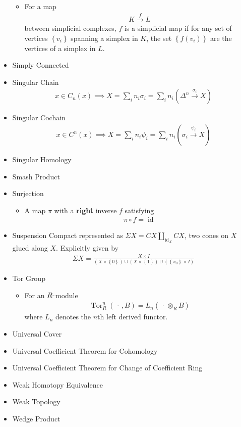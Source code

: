 \begin{itemize}
  \begin{itemize}
  \tightlist
  \item
    For a map
    \begin{align*}K\xrightarrow{f} L\end{align*}
    between simplicial complexes, \(f\) is a simplicial map if for any
    set of vertices \(\left\{{v_i}\right\}\) spanning a simplex in
    \(K\), the set \(\left\{{f(v_i)}\right\}\) are the vertices of a
    simplex in \(L\).
  \end{itemize}
\item
  Simply Connected
\item
  Singular Chain
  \begin{align*}
  x \in C_n(x) \implies X = \sum_i n_i \sigma_i = \sum_i n_i (\Delta^n \xrightarrow{\sigma_i} X)\end{align*}
\item
  Singular Cochain
  \begin{align*}
  x \in C^n(x) \implies X = \sum_i n_i \psi_i = \sum_i n_i (\sigma_i \xrightarrow{\psi_i} X)
  \end{align*}
\item
  Singular Homology
\item
  Smash Product
\item
  Surjection

  \begin{itemize}
  \tightlist
  \item
    A map \(\pi\) with a \textbf{right} inverse \(f\) satisfying
    \begin{align*}\pi \circ f = \operatorname{id}\end{align*}
  \end{itemize}
\item
  Suspension Compact represented as
  \(\Sigma X = CX \coprod_{\operatorname{id}_X} CX\), two cones on \(X\)
  glued along \(X\). Explicitly given by
  \begin{align*}
  \Sigma X = \frac{X\times I}{(X\times\left\{{0}\right\}) \cup(X\times\left\{{1}\right\}) \cup(\left\{{x_0}\right\} \times I)}
  \end{align*}
\item
  Tor Group

  \begin{itemize}
  \tightlist
  \item
    For an \(R{\hbox{-}}\)module
    \begin{align*}\operatorname{Tor}_R^n({\,\cdot\,}, B) = L_n({\,\cdot\,}\otimes_R B)\end{align*}
    where \(L_n\) denotes the \(n\)th left derived functor.
  \end{itemize}
\item
  Universal Cover
\item
  Universal Coefficient Theorem for Cohomology
\item
  Universal Coefficient Theorem for Change of Coefficient Ring
\item
  Weak Homotopy Equivalence
\item
  Weak Topology
\item
  Wedge Product
\end{itemize}

